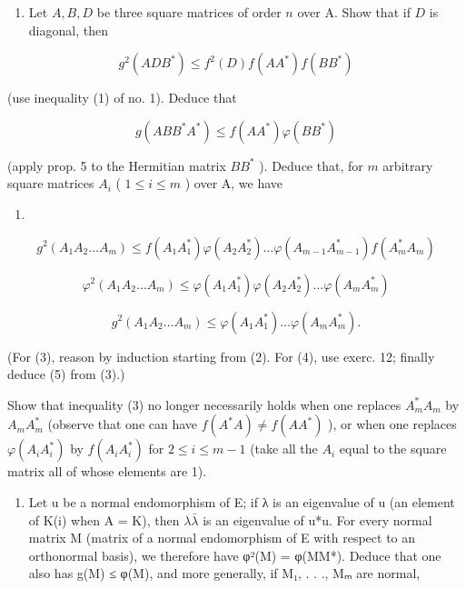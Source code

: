 \begin{enumerate}
\def\labelenumi{\alph{enumi})}
\tightlist
\item
  Let \(A, B, D\) be three square matrices of order \(n\) over A. Show that if \(D\) is diagonal, then
\end{enumerate}

\[
g ^ {2} (A D B ^ {*}) \leqslant f ^ {2} (D) f (A A ^ {*}) f (B B ^ {*})\tag{1}
\]

(use inequality (1) of no. 1). Deduce that

\[
g (A B B ^ {*} A ^ {*}) \leqslant f (A A ^ {*}) \varphi (B B ^ {*})\tag{2}
\]

(apply prop. 5 to the Hermitian matrix \(BB^{*}\) ). Deduce that, for \(m\) arbitrary square matrices \(A_{i}\) ( \(1 \leqslant i \leqslant m\) ) over A, we have

\begin{enumerate}
\def\labelenumi{(\arabic{enumi})}
\setcounter{enumi}{2}
\tightlist
\item
\end{enumerate}

\[
g ^ {2} (A _ {1} A _ {2} \dots A _ {m}) \leqslant f (A _ {1} A _ {1} ^ {*}) \varphi (A _ {2} A _ {2} ^ {*}) \dots \varphi (A _ {m - 1} A _ {m - 1} ^ {*}) f (A _ {m} ^ {*} A _ {m})\tag{4}
\]

\[
\varphi^ {2} (A _ {1} A _ {2} \dots A _ {m}) \leqslant \varphi (A _ {1} A _ {1} ^ {*}) \varphi (A _ {2} A _ {2} ^ {*}) \dots \varphi (A _ {m} A _ {m} ^ {*})\tag{5}
\]

\[
g ^ {2} (A _ {1} A _ {2} \dots A _ {m}) \leqslant \varphi (A _ {1} A _ {1} ^ {*}) \dots \varphi (A _ {m} A _ {m} ^ {*}).
\]

(For (3), reason by induction starting from (2). For (4), use exerc. 12; finally deduce (5) from (3).)

Show that inequality (3) no longer necessarily holds when one replaces \(A_{m}^{*}A_{m}\) by \(A_{m}A_{m}^{*}\) (observe that one can have \(f(A^{*}A)\neq f(A A^{*})\) ), or when one replaces \(\varphi(A_{i}A_{i}^{*})\) by \(f(A_{i}A_{i}^{*})\) for \(2\leqslant i\leqslant m-1\) (take all the \(A_{i}\) equal to the square matrix all of whose elements are 1).

\begin{enumerate}
\def\labelenumi{\alph{enumi})}
\setcounter{enumi}{1}
\tightlist
\item
  Let u be a normal endomorphism of E; if λ is an eigenvalue of u (an element of K(i) when A = K), then \(\lambda\bar{\lambda}\) is an eigenvalue of u*u. For every normal matrix M (matrix of a normal endomorphism of E with respect to an orthonormal basis), we therefore have φ²(M) = φ(MM*). Deduce that one also has g(M) ≤ φ(M), and more generally, if M₁, . . ., Mₘ are normal,
\end{enumerate}

